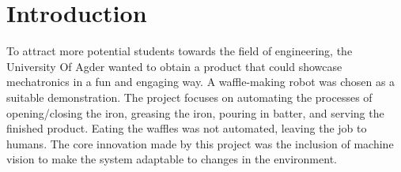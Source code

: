 \section{Introduction}
To attract more potential students towards the field of engineering, the University Of Agder wanted to obtain a product that could showcase mechatronics in a fun and engaging way. A waffle-making robot was chosen as a suitable demonstration. The project focuses on automating the processes of opening/closing the iron, greasing the iron, pouring in batter, and serving the finished product. Eating the waffles was not automated, leaving the job to humans. The core innovation made by this project was the inclusion of machine vision to make the system adaptable to changes in the environment. 

